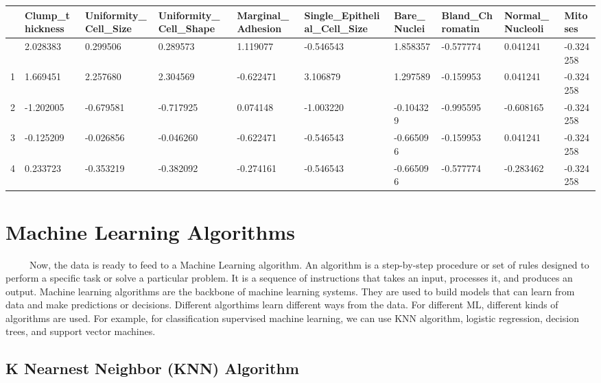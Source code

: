 \documentclass[
  letterpaper,
  DIV=11,
  numbers=noendperiod]{scrreprt}
\newcounter{none} %
\begin{document}
{\def\LTcaptype{none} %
\begin{longtable}[]{@{}llllllllll@{}}
\toprule\noalign{}
& Clump\_thickness & Uniformity\_Cell\_Size & Uniformity\_Cell\_Shape &
Marginal\_Adhesion & Single\_Epithelial\_Cell\_Size & Bare\_Nuclei &
Bland\_Chromatin & Normal\_Nucleoli & Mitoses \\
\midrule\noalign{}
\endhead
\bottomrule\noalign{}
\endlastfoot
0 & 2.028383 & 0.299506 & 0.289573 & 1.119077 & -0.546543 & 1.858357 &
-0.577774 & 0.041241 & -0.324258 \\
1 & 1.669451 & 2.257680 & 2.304569 & -0.622471 & 3.106879 & 1.297589 &
-0.159953 & 0.041241 & -0.324258 \\
2 & -1.202005 & -0.679581 & -0.717925 & 0.074148 & -1.003220 & -0.104329
& -0.995595 & -0.608165 & -0.324258 \\
3 & -0.125209 & -0.026856 & -0.046260 & -0.622471 & -0.546543 &
-0.665096 & -0.159953 & 0.041241 & -0.324258 \\
4 & 0.233723 & -0.353219 & -0.382092 & -0.274161 & -0.546543 & -0.665096
& -0.577774 & -0.283462 & -0.324258 \\
\end{longtable}
}

\section{Machine Learning Algorithms}\label{machine-learning-algorithms}

~~~~~Now, the data is ready to feed to a Machine Learning algorithm. An
algorithm is a step-by-step procedure or set of rules designed to
perform a specific task or solve a particular problem. It is a sequence
of instructions that takes an input, processes it, and produces an
output. Machine learning algorithms are the backbone of machine learning
systems. They are used to build models that can learn from data and make
predictions or decisions. Different algorthims learn different ways from
the data. For different ML, different kinds of algorithms are used. For
example, for classification supervised machine learning, we can use KNN
algorithm, logistic regression, decision trees, and support vector
machines.

\subsection{K Nearnest Neighbor (KNN)
Algorithm}\label{k-nearnest-neighbor-knn-algorithm}
\end{document}
